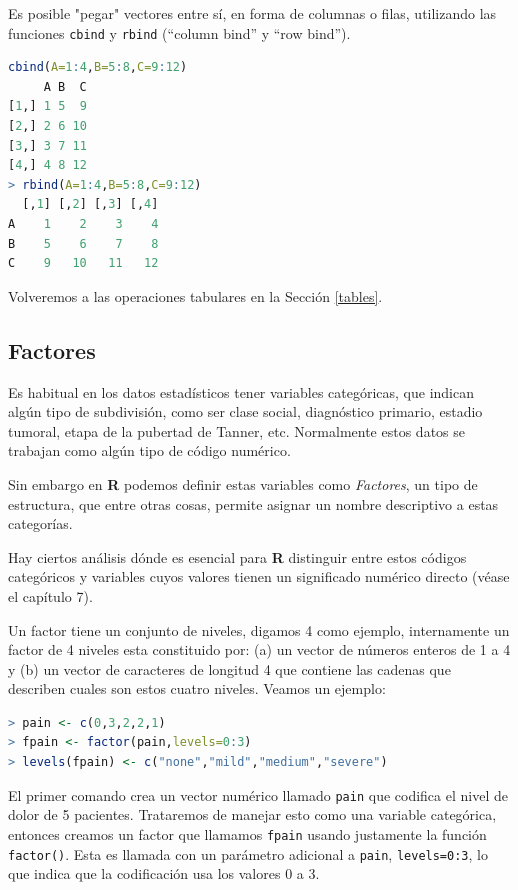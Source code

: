 Es posible "pegar" vectores entre sí, en forma de columnas o filas, utilizando
las funciones \texttt{cbind} y \texttt{rbind} (``column bind'' y ``row bind'').

\begin{lstlisting}[language=R]
cbind(A=1:4,B=5:8,C=9:12)
     A B  C
[1,] 1 5  9
[2,] 2 6 10
[3,] 3 7 11
[4,] 4 8 12
> rbind(A=1:4,B=5:8,C=9:12)
  [,1] [,2] [,3] [,4]
A    1    2    3    4
B    5    6    7    8
C    9   10   11   12
\end{lstlisting}

Volveremos a las operaciones tabulares en la Sección \ref{tables}.

\subsection{Factores}\label{factors}

Es habitual en los datos estadísticos tener variables categóricas, que indican
algún tipo de subdivisión, como ser clase social, diagnóstico primario, estadio
tumoral, etapa de la pubertad de Tanner, etc. Normalmente estos datos se
trabajan como algún tipo de código numérico.

Sin embargo en \textbf{R} podemos definir estas variables como
\textit{Factores}, un tipo de estructura, que entre otras cosas, permite
asignar un nombre descriptivo a estas categorías.

Hay ciertos análisis dónde es esencial para \textbf{R} distinguir
entre estos códigos categóricos y variables cuyos valores tienen un significado
numérico directo (véase el capítulo 7).

Un factor tiene un conjunto de niveles, digamos 4 como ejemplo, internamente un
factor de 4 niveles esta constituido por: (a) un vector de números enteros de 1
a 4 y (b) un vector de caracteres de longitud 4 que contiene las cadenas que
describen cuales son estos cuatro niveles. Veamos un ejemplo:

\begin{lstlisting}[language=R]
> pain <- c(0,3,2,2,1)
> fpain <- factor(pain,levels=0:3)
> levels(fpain) <- c("none","mild","medium","severe")
\end{lstlisting}

El primer comando crea un vector numérico llamado \texttt{pain} que codifica el
nivel de dolor de 5 pacientes. Trataremos de manejar esto como una variable
categórica, entonces creamos un factor que llamamos \texttt{fpain} usando
justamente la función \texttt{factor()}. Esta es llamada con un parámetro
adicional a \texttt{pain}, \texttt{levels=0:3}, lo que indica que la
codificación usa los valores 0 a 3.

